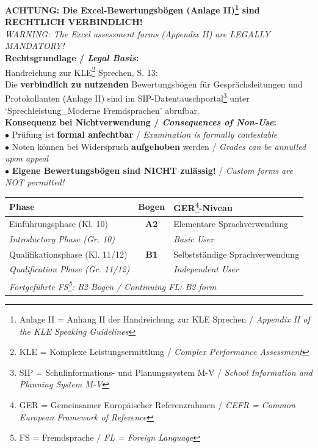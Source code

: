 \documentclass[10pt,a4paper]{article}
\begin{document}
\begin{kritischbox}
\textbf{ACHTUNG: Die Excel-Bewertungsbögen (Anlage II)\footnote{Anlage II = Anhang II der Handreichung zur KLE Sprechen / \textit{Appendix II of the KLE Speaking Guidelines}} sind RECHTLICH VERBINDLICH!}\\[0.2cm]
{\small\color{englishgray}\textit{WARNING: The Excel assessment forms (Appendix II) are LEGALLY MANDATORY!}}\\[0.4cm]

\textbf{Rechtsgrundlage / \textit{Legal Basis}:}\\
Handreichung zur KLE\footnote{KLE = Komplexe Leistungsermittlung / \textit{Complex Performance Assessment}} Sprechen, S. 13:\\
\glqq Die \textbf{verbindlich zu nutzenden} Bewertungsbögen für Gesprächsleitungen und Protokollanten (Anlage II) sind im SIP-Datentauschportal\footnote{SIP = Schulinformations- und Planungssystem M-V / \textit{School Information and Planning System M-V}} unter `Sprechleistung\_Moderne Fremdsprachen' abrufbar.\grqq\\[0.3cm]

\textbf{Konsequenz bei Nichtverwendung / \textit{Consequences of Non-Use}:}\\
$\bullet$ Prüfung ist \textbf{formal anfechtbar} / \textit{Examination is formally contestable}\\
$\bullet$ Noten können bei Widerspruch \textbf{aufgehoben} werden / \textit{Grades can be annulled upon appeal}\\
$\bullet$ \textbf{Eigene Bewertungsbögen sind NICHT zulässig!} / \textit{Custom forms are NOT permitted!}
\end{kritischbox}

\vspace{0.4cm}

\begin{center}
\begin{tabular}{|l|c|p{4cm}|}
\hline
\rowcolor{spaet}\color{white}\textbf{Phase} & \color{white}\textbf{Bogen} & \color{white}\textbf{GER\footnote{GER = Gemeinsamer Europäischer Referenzrahmen / \textit{CEFR = Common European Framework of Reference}}-Niveau} \\
\hline
Einführungsphase (Kl. 10) & \textcolor{spaet}{\textbf{A2}} & Elementare Sprachverwendung \\
{\scriptsize\color{englishgray}\textit{Introductory Phase (Gr. 10)}} & & {\scriptsize\color{englishgray}\textit{Basic User}} \\
\hline
Qualifikationsphase (Kl. 11/12) & \textcolor{spaet}{\textbf{B1}} & Selbstständige Sprachverwendung \\
{\scriptsize\color{englishgray}\textit{Qualification Phase (Gr. 11/12)}} & & {\scriptsize\color{englishgray}\textit{Independent User}} \\
\hline
\multicolumn{3}{|l|}{\textit{Fortgeführte FS\footnote{FS = Fremdsprache / \textit{FL = Foreign Language}}: B2-Bogen / \textit{Continuing FL: B2 form}}} \\
\hline
\end{tabular}
\end{center}
\end{document}
